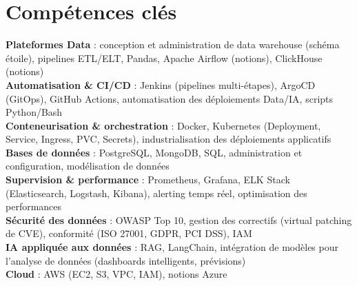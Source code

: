 \documentclass[a4paper,9pt]{article}
\begin{document}
\section{Compétences clés}
\textbf{Plateformes Data} : conception et administration de data warehouse (schéma étoile), pipelines ETL/ELT, Pandas, Apache Airflow (notions), ClickHouse (notions)\\[0.3pt]
\textbf{Automatisation \& CI/CD} : Jenkins (pipelines multi-étapes), ArgoCD (GitOps), GitHub Actions, automatisation des déploiements Data/IA, scripts Python/Bash\\[0.3pt]
\textbf{Conteneurisation \& orchestration} : Docker, Kubernetes (Deployment, Service, Ingress, PVC, Secrets), industrialisation des déploiements applicatifs\\[0.3pt]
\textbf{Bases de données} : PostgreSQL, MongoDB, SQL, administration et configuration, modélisation de données\\[0.3pt]
\textbf{Supervision \& performance} : Prometheus, Grafana, ELK Stack (Elasticsearch, Logstash, Kibana), alerting temps réel, optimisation des performances\\[0.3pt]
\textbf{Sécurité des données} : OWASP Top 10, gestion des correctifs (virtual patching de CVE), conformité (ISO 27001, GDPR, PCI DSS), IAM\\[0.3pt]
\textbf{IA appliquée aux données} : RAG, LangChain, intégration de modèles pour l'analyse de données (dashboards intelligents, prévisions)\\[0.3pt]
\textbf{Cloud} : AWS (EC2, S3, VPC, IAM), notions Azure
\end{document}
